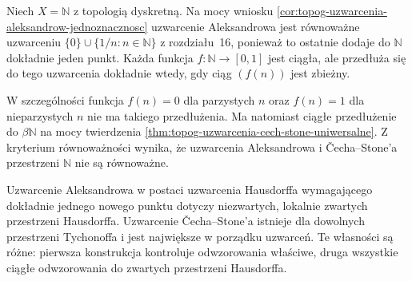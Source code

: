 \begin{przyklad}
\label{ex:topog-uzwarcenia-beta-n}
Niech $X=\mathbb N$ z topologią
dyskretną. Na mocy wniosku
\ref{cor:topog-uzwarcenia-aleksandrow-jednoznacznosc}
uzwarcenie Aleksandrowa
jest równoważne uzwarceniu
$\{0\}\cup\{1/n:n\in\mathbb N\}$
z rozdziału~16, ponieważ
to ostatnie dodaje do $\mathbb N$
dokładnie jeden punkt.
Każda funkcja $f\colon\mathbb N\to[0,1]$
jest ciągła, ale przedłuża się
do tego uzwarcenia dokładnie wtedy,
gdy ciąg $(f(n))$ jest zbieżny.

W szczególności funkcja
$f(n)=0$ dla parzystych $n$
oraz $f(n)=1$ dla nieparzystych $n$
nie ma takiego przedłużenia.
Ma natomiast ciągłe przedłużenie
do $\beta\mathbb N$
na mocy twierdzenia
\ref{thm:topog-uzwarcenia-cech-stone-uniwersalne}.
Z kryterium równoważności wynika,
że uzwarcenia Aleksandrowa i Čecha--Stone'a
przestrzeni $\mathbb N$ nie są równoważne.
\end{przyklad}

\begin{uwaga}
Uzwarcenie Aleksandrowa w postaci
uzwarcenia Hausdorffa wymagającego
dokładnie jednego nowego punktu
dotyczy niezwartych, lokalnie zwartych
przestrzeni Hausdorffa.
Uzwarcenie Čecha--Stone'a istnieje
dla dowolnych przestrzeni Tychonoffa
i jest największe w porządku uzwarceń.
Te własności są różne:
pierwsza konstrukcja kontroluje
odwzorowania właściwe, druga
wszystkie ciągłe odwzorowania
do zwartych przestrzeni Hausdorffa.
\end{uwaga}
